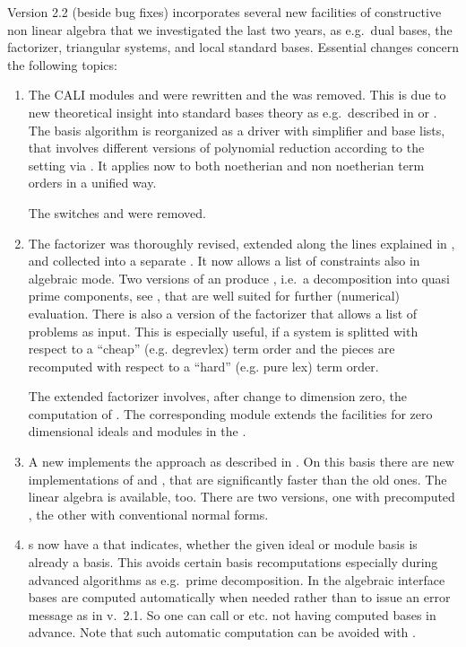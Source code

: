Version 2.2 (beside bug fixes) incorporates several new facilities of
constructive non linear algebra that we investigated the last two
years, as e.g.\ dual bases, the \gr factorizer, triangular systems, and
local standard bases. Essential changes concern the following topics:
\begin{enumerate}
\item The CALI modules  and  were rewritten and
the  was removed. This is  
due to new theoretical insight into standard bases theory as
e.g.\ described in \cite{tcah} or \cite{ala}. The \gr basis algorithm
is reorganized as a \gr driver with simplifier and base lists, that
involves different versions of polynomial reduction according to the
setting via . It applies now to
both noetherian and non noetherian term orders in a unified way.

The switches  and  were removed.

\item The \gr factorizer was thoroughly revised, extended along the
lines explained in \cite{fgb}, and collected into a separate
. It now allows a list of constraints also in
algebraic mode. Two versions of an 
produce , 
i.e.\ a decomposition into quasi prime components, see \cite{efgb},
that are well suited for further (numerical) evaluation. There is also
a version of the \gr factorizer that allows a list of problems as
input. This is especially useful, if a system is splitted with respect
to a ``cheap'' (e.g. degrevlex) term order and the pieces are
recomputed with respect to a ``hard'' (e.g. pure lex) term order.

The extended \gr factorizer involves, after change to dimension zero,
the computation of . The corresponding module
 extends the facilities for zero dimensional ideals and
modules in the .

\item A new  implements the  approach
as described in \cite{MMM}. On this basis there are new
implementations of  and , that
are significantly faster than the old ones. The linear algebra
 \cite{FGLM} is available, too. There are
two versions, one with precomputed , the other with
conventional normal forms.  

\item {}s now have a  that indicates, whether the
given ideal or module basis is already a \gr basis. This avoids
certain \gr basis recomputations especially during advanced algorithms
as e.g.\ prime decomposition. In the algebraic interface \gr bases are
computed automatically when needed rather than to issue an error
message as in v.\ 2.1. So one can call  or 
etc. not having computed \gr bases in advance. Note that such
automatic computation can be avoided with . 


\end{enumerate}
